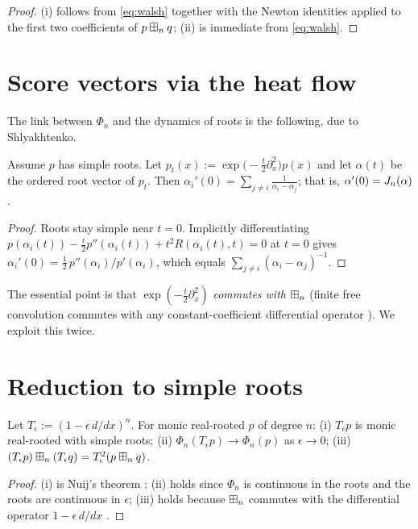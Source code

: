 \documentclass[11pt]{article}
\begin{document}
\begin{proof}
(i) follows from \eqref{eq:walsh} together with the Newton identities applied
to the first two coefficients of $p\boxplus_n q$; (ii) is immediate from
\eqref{eq:walsh}.
\end{proof}

\section*{Score vectors via the heat flow}

The link between $\Phi_n$ and the dynamics of roots is the following, due to
Shlyakhtenko.

\begin{qfourlemma}\label{lem:heat}
Assume $p$ has simple roots. Let $p_t(x):=\exp\!\bigl(-\tfrac{t}{2}\partial_x^2\bigr)p(x)$
and let $\alpha(t)$ be the ordered root vector of $p_t$. Then
$\alpha_i'(0)=\sum_{j\ne i}\frac{1}{\alpha_i-\alpha_j}$; that is,
$\alpha'(0)=J_n(\alpha)$.
\end{qfourlemma}

\begin{proof}
Roots stay simple near $t=0$. Implicitly differentiating
$p(\alpha_i(t))-\tfrac{t}{2}p''(\alpha_i(t))+t^2R(\alpha_i(t),t)=0$ at $t=0$
gives $\alpha_i'(0)=\tfrac12\,p''(\alpha_i)/p'(\alpha_i)$, which equals
$\sum_{j\ne i}(\alpha_i-\alpha_j)^{-1}$.
\end{proof}

The essential point is that $\exp(-\tfrac t2\partial_x^2)$ \emph{commutes with}
$\boxplus_n$ (finite free convolution commutes with any constant-coefficient
differential operator \cite{MSS22}). We exploit this twice.

\section*{Reduction to simple roots}

\begin{qfourlemma}\label{lem:simple}
Let $T_\epsilon:=(1-\epsilon\,d/dx)^n$. For monic real-rooted $p$ of degree $n$:
(i) $T_\epsilon p$ is monic real-rooted with simple roots; (ii)
$\Phi_n(T_\epsilon p)\to\Phi_n(p)$ as $\epsilon\to0$; (iii)
$(T_\epsilon p)\boxplus_n(T_\epsilon q)=T_\epsilon^2(p\boxplus_n q)$.
\end{qfourlemma}

\begin{proof}
(i) is Nuij's theorem \cite{Nuij}; (ii) holds since $\Phi_n$ is continuous in
the roots and the roots are continuous in $\epsilon$; (iii) holds because $\boxplus_n$
commutes with the differential operator $1-\epsilon\,d/dx$ \cite{MSS22}.
\end{proof}
\end{document}
